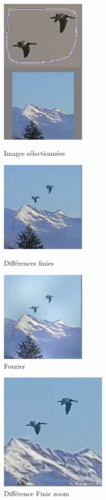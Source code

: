 \begin{figure}[!htb]
   \begin{minipage}{0.33\textwidth}
     \centering
     \includegraphics[width = 120pt]{Images/Resultats/OiseauMont.png}
     \caption{Images sélectionnées}
      \end{minipage}\hfill
   \begin{minipage}{0.33\textwidth}
     \centering
     \includegraphics[width = 120pt]{Images/Resultats/oiseauRenduDF.png}
     \caption{Différences finies}
      \end{minipage}\hfill
   \begin{minipage}{0.33\textwidth}
     \centering
     \includegraphics[width= 120pt]{Images/Resultats/OiseauRenduFourier.png}
     \caption{Fourier}
   \end{minipage}
\end{figure}
\begin{figure}[!htb]
\centering
\includegraphics[scale=0.5]{Images/Resultats/zoomOiseauDF.png}
\caption{Différence Finie zoom}
\end{figure}
